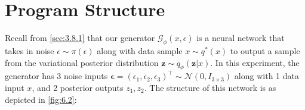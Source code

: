 \documentclass[honours,12pt]{unswthesis}
\numberwithin{equation}{section}
\theoremstyle{definition}
\begin{document}
\section{Program Structure}
Recall from \autoref{sec:3.8.1} that our generator $\mathcal{G}_\phi(x,\epsilon)$ is a neural network that takes in noise $\epsilon\sim \pi(\epsilon)$ along with data sample $x\sim q^*(x)$ to output a sample from the variational posterior distribution $\bm{z}\sim q_\phi(\bm{z}|x)$. In this experiment, the generator has 3 noise inputs $\bm{\epsilon}=(\epsilon_1,\epsilon_2,\epsilon_3)^\top \sim \mathcal{N}(0,I_{3\times 3})$ along with 1 data input $x$, and 2 posterior outputs $z_1, z_2$. The structure of this network is as depicted in \autoref{fig:6.2}:
\begin{figure}[h!]
\end{figure}
\end{document}
